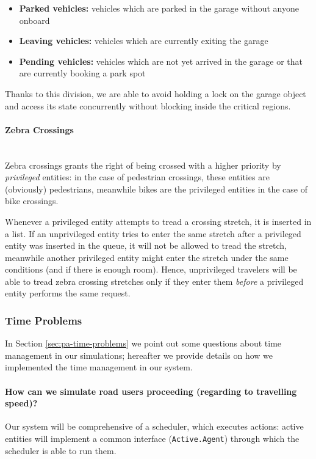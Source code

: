 \begin{itemize}
  \item \textbf{Parked vehicles:} vehicles which are parked in the garage
    without anyone onboard
  \item \textbf{Leaving vehicles:} vehicles which are currently exiting the
    garage
  \item \textbf{Pending vehicles:} vehicles which are not yet arrived in the
    garage or that are currently booking a park spot
\end{itemize}

Thanks to this division, we are able to avoid holding a lock on the garage
object and access its state concurrently without blocking inside the critical
regions.

\paragraph{Zebra Crossings} \mbox{} \\
Zebra crossings grants the right of being crossed with a higher priority by
\textit{privileged} entities: in the case of pedestrian crossings, these
entities are (obviously) pedestrians, meanwhile bikes are the privileged
entities in the case of bike crossings.

Whenever a privileged entity attempts to tread a crossing stretch, it is
inserted in a list. If an unprivileged entity tries to enter the same stretch
after a privileged entity was inserted in the queue, it will not be allowed to
tread the stretch, meanwhile another privileged entity might enter the stretch
under the same conditions (and if there is enough room).
Hence, unprivileged travelers will be able to tread zebra crossing stretches
only if they enter them \textit{before} a privileged entity performs the same
request.



\subsubsection{Time Problems}

In Section \ref{sec:pa-time-problems} we point out some questions
about time management in our simulations; hereafter we provide
details on how we implemented the time management in our system.

\paragraph{How can we simulate road users proceeding (regarding to travelling
  speed)?}
Our system will be comprehensive of a scheduler, which executes actions:
active entities will implement a common interface (\texttt{Active.Agent})
through which the scheduler is able to run them.

